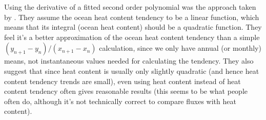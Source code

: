 Using the derivative of a fitted second order polynomial was the approach taken by \citet{Nummelin_2017}. They assume the ocean heat content tendency to be a linear function, which means that its integral (ocean heat content) should be a quadratic function. They feel it's a better approximation of the ocean heat content tendency than a simple $(y_{n+1} - y_n) / (x_{n+1} - x_n)$ calculation, since we only have annual (or monthly) means, not instantaneous values needed for calculating the tendency. They also suggest that since heat content is usually only slightly quadratic (and hence heat content tendency trends are small), even using heat content instead of heat content tendency often gives reasonable results (this seems to be what people often do, although it's not technically correct to compare fluxes with heat content).
